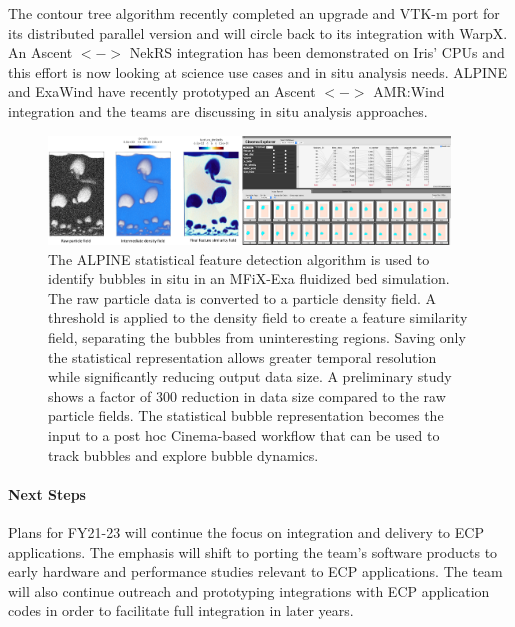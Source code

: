 The contour tree algorithm recently completed an upgrade and VTK-m port for its distributed parallel version and will circle back to its integration with WarpX.   An Ascent $<->$ NekRS  integration has been demonstrated on Iris' CPUs and this effort is now looking at science use cases and in situ analysis needs.   ALPINE and ExaWind have recently prototyped an Ascent $<->$ AMR:Wind integration and the teams are discussing in situ analysis approaches.  

\begin{figure}[htb]
	\begin{center}
		\includegraphics[width=0.95\textwidth]{projects/2.3.4-DataViz/2.3.4.16-ALPINE-ZFP/alpine-cinema-mfixexa-workflow.png}
		\caption{The ALPINE statistical feature detection algorithm is used to identify bubbles in situ in an MFiX-Exa fluidized bed simulation.  The raw particle data is converted to a particle density field.  A threshold is applied to the density field to create a feature similarity field, separating the bubbles from uninteresting regions.  Saving only the statistical representation allows greater temporal resolution while significantly reducing output data size.  A preliminary study shows a factor of 300 reduction in data size compared to the raw particle fields. The statistical bubble representation becomes the input to a post hoc Cinema-based workflow that can be used to track bubbles and explore bubble dynamics. }
		\label{fig:alpine-statistical-feature}
	\end{center}
\end{figure}

\paragraph{Next Steps}

Plans for FY21-23 will continue the focus on integration and delivery to ECP applications. The emphasis will shift to porting the team’s software products to early hardware and performance studies relevant to ECP applications. The team will also continue outreach and prototyping integrations with ECP application codes in order to facilitate full integration in later years.

